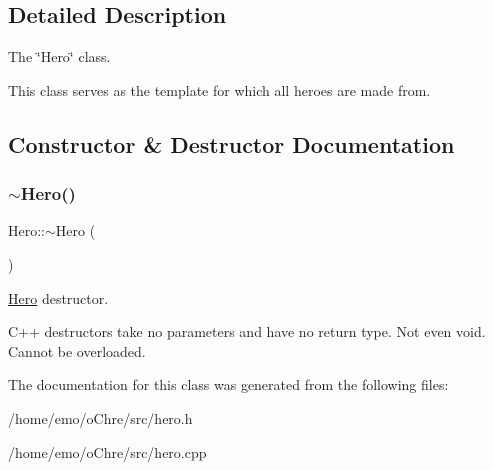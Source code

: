 \subsection{Detailed Description}
The \char`\"{}\+Hero\char`\"{} class. 

This class serves as the template for which all heroes are made from. 

\subsection{Constructor \& Destructor Documentation}
\mbox{\label{classHero_a5aeef41ede5a80dc29c5acd7b553c4da}} 
\subsubsection{\texorpdfstring{$\sim$\+Hero()}{~Hero()}}
{\footnotesize\ttfamily Hero\+::$\sim$\+Hero (\begin{DoxyParamCaption}{ }\end{DoxyParamCaption})}



\hyperlink{classHero}{Hero} destructor. 

C++ destructors take no parameters and have no return type. Not even void. Cannot be overloaded. 

The documentation for this class was generated from the following files\+:\begin{DoxyCompactItemize}
\item 
/home/emo/o\+Chre/src/hero.\+h\item 
/home/emo/o\+Chre/src/hero.\+cpp\end{DoxyCompactItemize}
